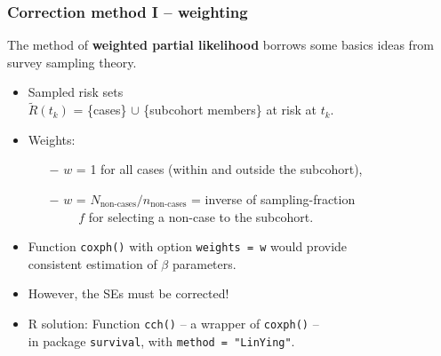 \documentclass[12pt,dvipsnames,t,handout%
,aspectratio=169%
]{beamer}
\begin{document}
\begin{frame}
  \frametitle{Correction method I -- weighting}

The method of \textbf{weighted partial likelihood}
borrows some basics ideas from survey sampling theory.
\pause
\begin{itemize} 
\item
 Sampled risk sets \\ $\widetilde{R}(t_k)$ 
  = \{cases\} $\cup$ \{subcohort members\} at risk at $t_k$.
\pause
 \medskip
 \item
  Weights:
 {\normalsize 
 \begin{itemize}
  \item[$-$]
   $w$ = 1 for all cases (within and outside the subcohort),
\pause   
    \item[$-$]  
   $w$ = $N_{\text{non-cases}}/
   n_{\text{non-cases}}$ = inverse of sampling-fraction \\
  ${}\qquad$ $f$ for selecting a non-case to the subcohort.
  \end{itemize} 
  }
  \pause
  \medskip
  \item
  Function {\tt coxph()} with option {\tt weights = w} would
  provide \\ consistent estimation of $\beta$ parameters.
  \pause
 \medskip
\item
However, the SEs must be corrected! %
\pause
\medskip
\item
R solution: Function {\tt cch()} --
a wrapper of {\tt coxph()} -- \\ in package {\tt survival}, 
with {\tt method = "LinYing"}.
\end{itemize}

\end{frame}
\end{document}

